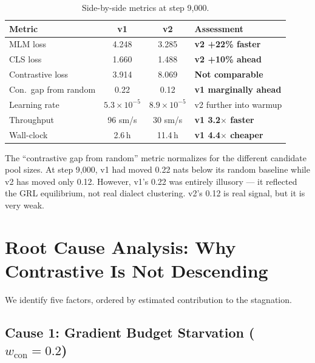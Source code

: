 \documentclass[11pt,a4paper]{article}
\begin{document}
\begin{table}[H]
\centering
\caption{Side-by-side metrics at step 9{,}000.}
\label{tab:metrics}
\begin{tabular}{@{}lccl@{}}
\toprule
\textbf{Metric} & \textbf{v1} & \textbf{v2} & \textbf{Assessment} \\
\midrule
MLM loss          & 4.248 & 3.285 & \textcolor{okcolor}{\textbf{v2 +22\% faster}} \\
CLS loss          & 1.660 & 1.488 & \textcolor{okcolor}{\textbf{v2 +10\% ahead}} \\
Contrastive loss  & 3.914 & 8.069 & \textcolor{warncolor}{\textbf{Not comparable}} \\
Con.\ gap from random & 0.22  & 0.12  & \textcolor{v1color}{\textbf{v1 marginally ahead}} \\
Learning rate     & $5.3 \times 10^{-5}$ & $8.9 \times 10^{-5}$ & v2 further into warmup \\
Throughput        & 96 sm/s & 30 sm/s & \textcolor{v1color}{\textbf{v1 3.2$\times$ faster}} \\
Wall-clock        & 2.6\,h & 11.4\,h & \textcolor{v1color}{\textbf{v1 4.4$\times$ cheaper}} \\
\bottomrule
\end{tabular}
\end{table}

The ``contrastive gap from random'' metric normalizes for the different candidate pool
sizes. At step 9{,}000, v1 had moved 0.22 nats below its random baseline while v2
has moved only 0.12. However, v1's 0.22 was entirely illusory --- it reflected the
GRL equilibrium, not real dialect clustering. v2's 0.12 is real signal, but it is
very weak.


\section{Root Cause Analysis: Why Contrastive Is Not Descending}

We identify five factors, ordered by estimated contribution to the stagnation.

\subsection{Cause 1: Gradient Budget Starvation ($w_{\text{con}} = 0.2$)}
\label{sec:cause1}
\end{document}
